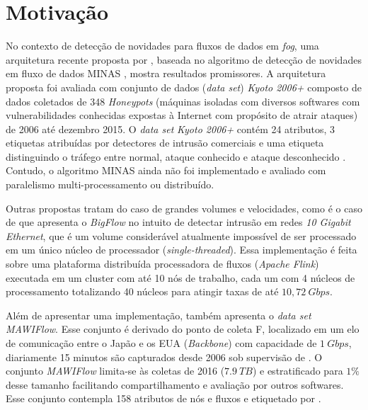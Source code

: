 \section{Motivação}

No contexto de detecção de novidades para fluxos de dados em \emph{fog}, uma
arquitetura recente proposta por , baseada no algoritmo
de detecção de novidades em fluxo de dados MINAS
\cite{Faria2016minas}, mostra resultados promissores.
A arquitetura proposta foi avaliada com conjunto de dados (\emph{data set}) \emph{Kyoto 2006+} 
composto de dados coletados de 348 \emph{Honeypots} (máquinas isoladas com diversos softwares
com vulnerabilidades conhecidas expostas à Internet com propósito de atrair
ataques) de 2006 até dezembro 2015. 
O \emph{data set} \emph{Kyoto 2006+} contém 24 atributos, 3 etiquetas atribuídas por
detectores de intrusão comerciais e uma etiqueta
distinguindo o tráfego entre normal, ataque conhecido e ataque desconhecido
\cite{Cassales2019a}.
Contudo, o algoritmo MINAS ainda não foi implementado e avaliado com paralelismo
multi-processamento ou distribuído.

Outras propostas tratam do caso de grandes volumes e velocidades, como é o caso
de  que apresenta o \emph{BigFlow} no intuito de detectar
intrusão em redes \emph{10 Gigabit Ethernet}, que é um volume considerável
atualmente impossível de ser processado em um único núcleo de processador
(\emph{single-threaded}). Essa implementação é feita sobre uma plataforma
distribuída processadora de fluxos (\emph{Apache Flink}) executada em um cluster
com até 10 nós de trabalho, cada um com 4 núcleos de processamento totalizando
40 núcleos para atingir taxas de até $10,72 \ Gbps$.

Além de apresentar uma implementação,  também apresenta o
\emph{data set} \emph{MAWIFlow}. Esse conjunto é derivado do ponto de coleta
F, localizado em um elo de comunicação entre o Japão e os EUA (\emph{Backbone})
com capacidade de $1\ Gbps$, diariamente 15 minutos são capturados desde 2006
sob supervisão de  \cite{Fontugne2010}. O conjunto
\emph{MAWIFlow} limita-se às coletas de 2016 ($7.9\ TB$) e estratificado para
$1\%$ desse tamanho facilitando compartilhamento e avaliação por outros
softwares. Esse conjunto contempla 158 atributos de nós e fluxos e etiquetado
por .


